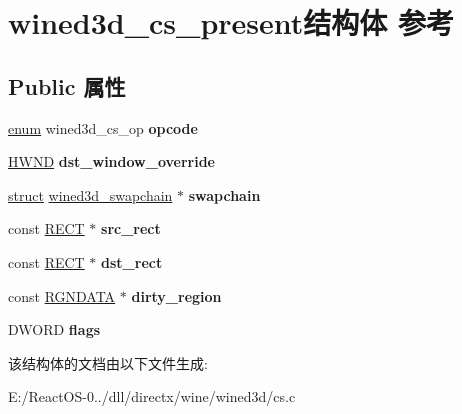 \hypertarget{structwined3d__cs__present}{}\section{wined3d\+\_\+cs\+\_\+present结构体 参考}
\label{structwined3d__cs__present}
\subsection*{Public 属性}
\begin{DoxyCompactItemize}
\item 
\mbox{\label{structwined3d__cs__present_aa3d333e2cc84675ad6ecebfa1da9696c}} 
\hyperlink{interfaceenum}{enum} wined3d\+\_\+cs\+\_\+op {\bfseries opcode}
\item 
\mbox{\label{structwined3d__cs__present_a205b7b49caae760c996cd3814188ce1d}} 
\hyperlink{interfacevoid}{H\+W\+ND} {\bfseries dst\+\_\+window\+\_\+override}
\item 
\mbox{\label{structwined3d__cs__present_ae820a0f6142f491f480a675658ecfe63}} 
\hyperlink{interfacestruct}{struct} \hyperlink{structwined3d__swapchain}{wined3d\+\_\+swapchain} $\ast$ {\bfseries swapchain}
\item 
\mbox{\label{structwined3d__cs__present_a3d6c0fa49547fec625e682bb02d711d8}} 
const \hyperlink{structtag_r_e_c_t}{R\+E\+CT} $\ast$ {\bfseries src\+\_\+rect}
\item 
\mbox{\label{structwined3d__cs__present_a32917e319f8e72a0e06afe0ce34f4cf9}} 
const \hyperlink{structtag_r_e_c_t}{R\+E\+CT} $\ast$ {\bfseries dst\+\_\+rect}
\item 
\mbox{\label{structwined3d__cs__present_a0af7d4e9ca51ea547b98d3f61743033a}} 
const \hyperlink{struct___r_g_n_d_a_t_a}{R\+G\+N\+D\+A\+TA} $\ast$ {\bfseries dirty\+\_\+region}
\item 
\mbox{\label{structwined3d__cs__present_af988b160f51abb6de92e88312d3b74a8}} 
D\+W\+O\+RD {\bfseries flags}
\end{DoxyCompactItemize}


该结构体的文档由以下文件生成\+:\begin{DoxyCompactItemize}
\item 
E\+:/\+React\+O\+S-\/0../dll/directx/wine/wined3d/cs.\+c\end{DoxyCompactItemize}
